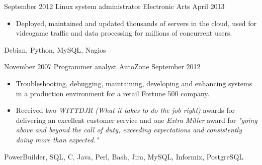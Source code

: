 \begin{experiences}
    \emptySeparator

    \experience
        {September 2012}
        {Linux system administrator}
        {Electronic Arts}
        {April 2013}
        {
            \begin{itemize}
                \item Deployed, maintained and updated thousands of servers in 
                    the cloud, used for videogame traffic and data processing 
                    for millions of concurrent users.
            \end{itemize}
        }
        {
            Debian,
            Python,
            MySQL,
            Nagios
        }

    \emptySeparator

    \experience
        {November 2007}
        {Programmer analyst}
        {AutoZone}
        {September 2012}
        {
            \begin{itemize}
                \item Troubleshooting, debugging, maintaining, developing and 
                    enhancing systems in a production environment 
                    for a retail Fortune 500 company.
                \item Received two \textit{WITTDJR (What it takes to do the job 
                    right)} awards for delivering an excellent customer service 
                    and one \textit{Extra Miller} award for \textit{"going 
                    above and beyond the call of duty, exceeding expectations 
                    and consistently doing more than expected."}
            \end{itemize}
        }
        {
            PowerBuilder, 
            SQL, 
            C, 
            Java, 
            Perl, 
            Bash, 
            Jira, 
            MySQL, 
            Informix, 
            PostgreSQL
        }

\end{experiences}

